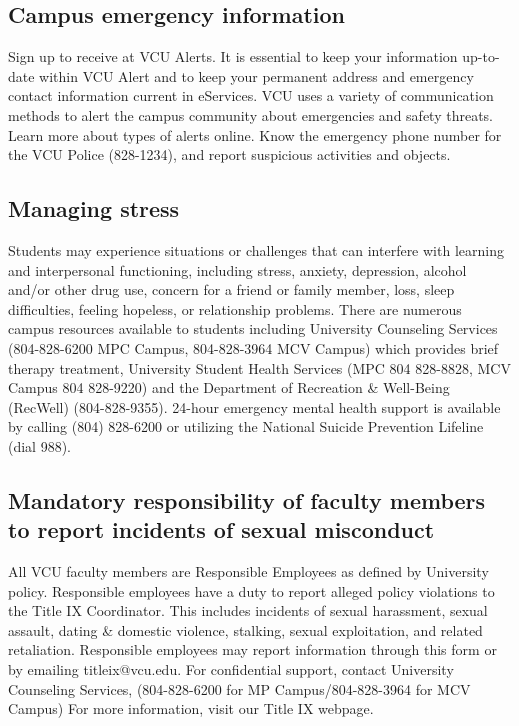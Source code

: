 \documentclass[
  letterpaper,
]{book}
\begin{document}
\subsection*{Campus emergency
information}\label{campus-emergency-information}

Sign up to receive at VCU Alerts. It is essential to keep your
information up-to-date within VCU Alert and to keep your permanent
address and emergency contact information current in eServices. VCU uses
a variety of communication methods to alert the campus community about
emergencies and safety threats. Learn more about types of alerts online.
Know the emergency phone number for the VCU Police (828-1234), and
report suspicious activities and objects.

\subsection*{Managing stress}\label{managing-stress}

Students may experience situations or challenges that can interfere with
learning and interpersonal functioning, including stress, anxiety,
depression, alcohol and/or other drug use, concern for a friend or
family member, loss, sleep difficulties, feeling hopeless, or
relationship problems. There are numerous campus resources available to
students including University Counseling Services (804-828-6200 MPC
Campus, 804-828-3964 MCV Campus) which provides brief therapy treatment,
University Student Health Services (MPC 804 828-8828, MCV Campus 804
828-9220) and the Department of Recreation \& Well-Being (RecWell)
(804-828-9355). 24-hour emergency mental health support is available by
calling (804) 828-6200 or utilizing the National Suicide Prevention
Lifeline (dial 988).

\subsection*{Mandatory responsibility of faculty members to report
incidents of sexual
misconduct}\label{mandatory-responsibility-of-faculty-members-to-report-incidents-of-sexual-misconduct}

All VCU faculty members are Responsible Employees as defined by
University policy. Responsible employees have a duty to report alleged
policy violations to the Title IX Coordinator. This includes incidents
of sexual harassment, sexual assault, dating \& domestic violence,
stalking, sexual exploitation, and related retaliation. Responsible
employees may report information through this form or by emailing
titleix@vcu.edu. For confidential support, contact University Counseling
Services, (804-828-6200 for MP Campus/804-828-3964 for MCV Campus) For
more information, visit our Title IX webpage.
\end{document}
